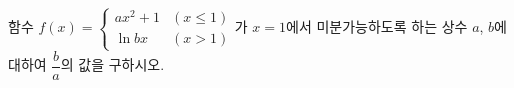 함수 $f(x)=\begin{cases} ax^2+1 & (x\le 1) \\ \ln bx & (x>1) \end{cases}$가 $x=1$에서 미분가능하도록 하는 상수 $a$, $b$에 대하여 $\dfrac{b}{a}$의 값을 구하시오. 
